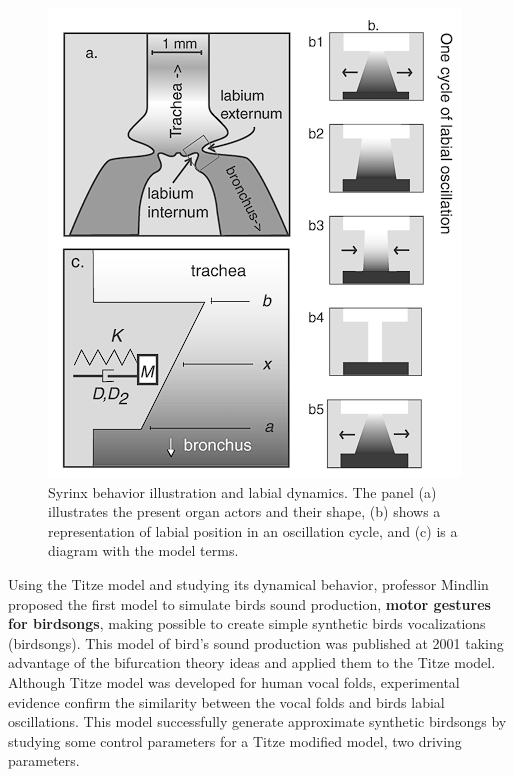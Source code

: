 \vspace{10pt}


\begin{minipage}{0.55\linewidth}
\begin{figure}[H]
    \centering
    \includegraphics[width=0.9\linewidth]{Images/simple_gestures.png}
    \caption{Syrinx behavior illustration and labial dynamics. The panel (a) illustrates the present organ actors and their shape, (b) shows a representation of labial position in an oscillation cycle, and (c) is a diagram with the model terms. \cite{simple_motor_gestures_2001}}
    \label{fig:simple_gestures}
\end{figure}    
\end{minipage}\hfill
\begin{minipage}{0.4\linewidth}
Using the Titze model and studying its dynamical behavior, professor Mindlin proposed the first model to simulate birds sound production, \textbf{motor gestures for birdsongs}, making possible to create simple synthetic birds vocalizations (birdsongs). This model of bird's sound production was published at 2001 \cite{simple_motor_gestures_2001} taking advantage of the bifurcation theory ideas and applied them to the Titze model. Although Titze model was developed for human vocal folds, experimental evidence \cite{syrinx_exp} confirm the similarity between the vocal folds and birds labial oscillations. This model successfully generate approximate synthetic birdsongs by studying some control parameters for a Titze modified model, two driving parameters.    
\end{minipage}

